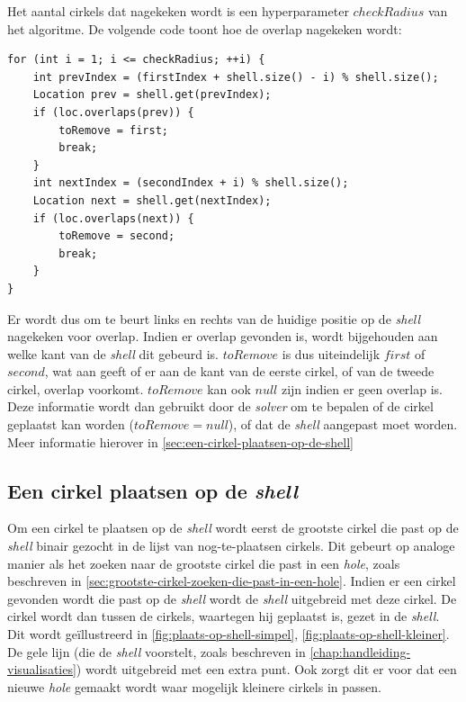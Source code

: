 \documentclass[12pt,a4paper,oneside]{book}
\begin{document}
Het aantal cirkels dat nagekeken wordt is een hyperparameter $checkRadius$ van het algoritme.
De volgende code toont hoe de overlap nagekeken wordt:

\begin{lstlisting}
for (int i = 1; i <= checkRadius; ++i) {
	int prevIndex = (firstIndex + shell.size() - i) % shell.size();
	Location prev = shell.get(prevIndex);
	if (loc.overlaps(prev)) {
		toRemove = first;
		break;
	}
	int nextIndex = (secondIndex + i) % shell.size();
	Location next = shell.get(nextIndex);
	if (loc.overlaps(next)) {
		toRemove = second;
		break;
	}
}
\end{lstlisting}

Er wordt dus om te beurt links en rechts van de huidige positie op de \textit{shell} nagekeken voor overlap.
Indien er overlap gevonden is, wordt bijgehouden aan welke kant van de \textit{shell} dit gebeurd is.
$toRemove$ is dus uiteindelijk $first$ of $second$, wat aan geeft of er aan de kant van de eerste cirkel, of van de tweede cirkel, overlap voorkomt.
$toRemove$ kan ook $null$ zijn indien er geen overlap is.
Deze informatie wordt dan gebruikt door de \textit{solver} om te bepalen of de cirkel geplaatst kan worden ($toRemove = null$), of dat de \textit{shell} aangepast moet worden.
Meer informatie hierover in \autoref{sec:een-cirkel-plaatsen-op-de-shell}

\subsection{Een cirkel plaatsen op de \textit{shell}} \label{sec:een-cirkel-plaatsen-op-de-shell}

Om een cirkel te plaatsen op de \textit{shell} wordt eerst de grootste cirkel die past op de \textit{shell} binair gezocht in de lijst van nog-te-plaatsen cirkels.
Dit gebeurt op analoge manier als het zoeken naar de grootste cirkel die past in een \textit{hole}, zoals beschreven in \autoref{sec:grootste-cirkel-zoeken-die-past-in-een-hole}.
Indien er een cirkel gevonden wordt die past op de \textit{shell} wordt de \textit{shell} uitgebreid met deze cirkel.
De cirkel wordt dan tussen de cirkels, waartegen hij geplaatst is, gezet in de \textit{shell}.
Dit wordt geïllustreerd in \autoref{fig:plaats-op-shell-simpel}, \autoref{fig:plaats-op-shell-kleiner}.
De gele lijn (die de \textit{shell} voorstelt, zoals beschreven in \autoref{chap:handleiding-visualisaties}) wordt uitgebreid met een extra punt.
Ook zorgt dit er voor dat een nieuwe \textit{hole} gemaakt wordt waar mogelijk kleinere cirkels in passen.
\end{document}
